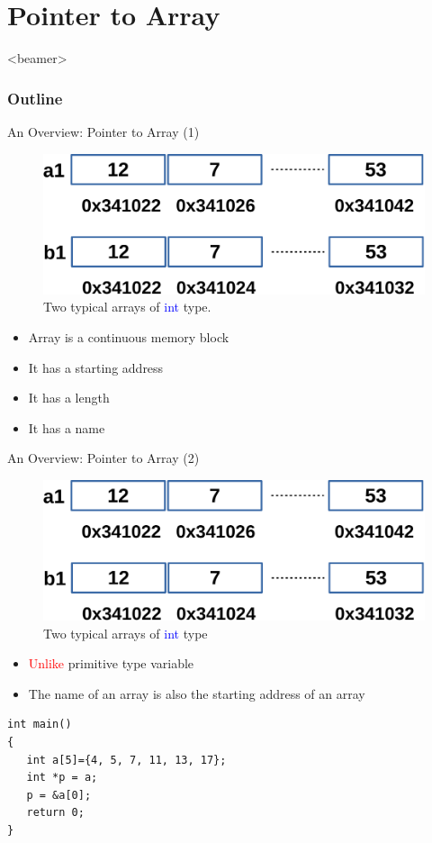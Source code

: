 \section{Pointer to Array}
\label{sec:structs}
\begin{frame}<beamer>
    \frametitle{Outline}
    \tableofcontents[currentsection]
\end{frame}

\begin{frame}{An Overview: Pointer to Array (1)}
\begin{figure}
	\includegraphics[width=0.68\linewidth]{figs/array1.pdf}
	\caption{Two typical arrays of \textcolor{blue}{int} type.}
\end{figure}
\begin{itemize}
	\item {Array is a continuous memory block}
	\item {It has a starting address}
	\item {It has a length}
	\item {It has a name}
\end{itemize}
\end{frame}

\begin{frame}[fragile]{An Overview: Pointer to Array (2)}
\begin{figure}
	\includegraphics[width=0.57\linewidth]{figs/array1.pdf}
	\caption{Two typical arrays of \textcolor{blue}{int} type}
\end{figure}
\begin{itemize}
	\item {\textcolor{red}{Unlike} primitive type variable}
	\item {The name of an array is also the starting address of an array}
\end{itemize}
\begin{lstlisting}[xleftmargin=0.08\linewidth, linewidth=0.9\linewidth]
int main()
{
   int a[5]={4, 5, 7, 11, 13, 17};
   int *p = a;
   p = &a[0];
   return 0;
}
\end{lstlisting}
\end{frame}

